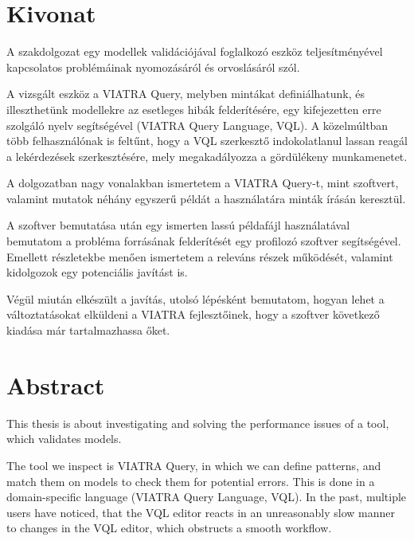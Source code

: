 \documentclass[11pt,a4paper,oneside]{report}
\begin{document}

\clearpage

\selectthesislanguage

\tableofcontents\cleardoublepage



\setcounter{page}{1}

\selecthungarian
\chapter*{Kivonat}
A szakdolgozat egy modellek validációjával foglalkozó eszköz teljesítményével
kapcsolatos problémáinak nyomozásáról és orvoslásáról szól.

A vizsgált eszköz a VIATRA Query, melyben mintákat definiálhatunk, és
illeszthetünk modellekre az esetleges hibák felderítésére, egy kifejezetten erre
szolgáló nyelv segítségével (VIATRA Query Language, VQL). A közelmúltban több
felhasználónak is feltűnt, hogy a VQL szerkesztő indokolatlanul lassan reagál
a lekérdezések szerkesztésére, mely megakadályozza a gördülékeny munkamenetet.

A dolgozatban nagy vonalakban ismertetem a VIATRA Query-t, mint szoftvert,
valamint mutatok néhány egyszerű példát a használatára minták írásán keresztül.

A szoftver bemutatása után egy ismerten lassú példafájl használatával bemutatom
a probléma forrásának felderítését egy profilozó szoftver segítségével. Emellett
részletekbe menően ismertetem a releváns részek működését, valamint kidolgozok
egy potenciális javítást is.

Végül miután elkészült a javítás, utolsó lépésként bemutatom, hogyan lehet a
változtatásokat elküldeni a VIATRA fejlesztőinek, hogy a szoftver következő
kiadása már tartalmazhassa őket.
\vfill

\selectenglish
\chapter*{Abstract}
This thesis is about investigating and solving the performance issues of a tool,
which validates models.

The tool we inspect is VIATRA Query, in which we can define patterns, and match
them on models to check them for potential errors. This is done in a
domain-specific language (VIATRA Query Language, VQL). In the past, multiple
users have noticed, that the VQL editor reacts in an unreasonably slow manner to
changes in the VQL editor, which obstructs a smooth workflow.
\end{document}
